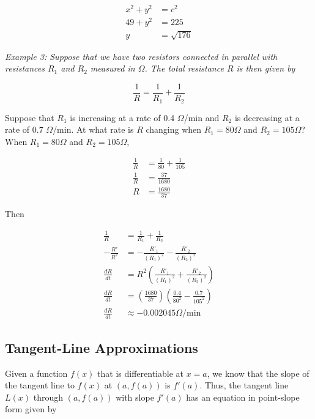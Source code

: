 \documentclass{article}
\begin{document}
        \begin{align*}
            x^2+y^2     &=c^2 \\
            49 + y^2    &= 225 \\
            y           &= \sqrt{176}
        \end{align*}

        \noindent \color{blue} \textit{Example 3: Suppose that we have two resistors connected in
        parallel with resistances $R_1$ and $R_2$ measured in $\Omega$. The total resistance $R$
        is then given by}

        \begin{equation*}
            \frac{1}{R} = \frac{1}{R_1} + \frac{1}{R_2}
        \end{equation*}

        \noindent Suppose that $R_1$ is increasing at a rate of 0.4 $\Omega$/min and $R_2$ is
        decreasing at a rate of 0.7 $\Omega$/min. At what rate is $R$ changing when $R_1=80\Omega$
        and $R_2=105\Omega$? \color{black} \\

        \noindent When $R_1=80\Omega$ and $R_2=105\Omega$,

        \begin{align*}
            \frac{1}{R}     &= \frac{1}{80} + \frac{1}{105} \\
            \frac{1}{R}     &= \frac{37}{1680} \\
            R               &= \frac{1680}{37}
        \end{align*}

        \noindent Then

        \begin{align*}
            \frac{1}{R}     &= \frac{1}{R_1} + \frac{1}{R_2} \\
            -\frac{R'}{R^2} &= -\frac{R'_1}{(R_1)^2} - \frac{R'_2}{(R_2)^2} \\
            \frac{dR}{dt}   &= R^2\left(\frac{R'_1}{(R_1)^2}+\frac{R'_2}{(R_2)^2}\right) \\
            \frac{dR}{dt}   &= \left(\frac{1680}{37}\right)\left(\frac{0.4}{80^2}-\frac{0.7}{105^2}\right) \\
            \frac{dR}{dt}   &\approx -0.002045 \Omega\text{/min}
        \end{align*}


    \subsection{Tangent-Line Approximations}
        Given a function $f(x)$ that is differentiable at $x=a$, we know that the slope of the
        tangent line to $f(x)$ at $(a,f(a))$ is $f'(a)$. Thus, the tangent line $L(x)$ through
        $(a,f(a))$ with slope $f'(a)$ has an equation in point-slope form given by
\end{document}
